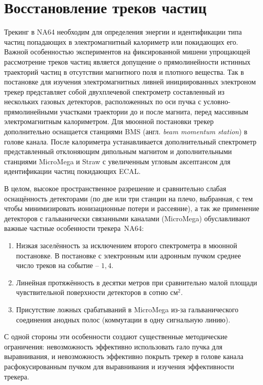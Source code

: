 \section{Восстановление треков частиц}

Трекинг в NA64 необходим для определения энергии и идентификации
типа частиц попадающих в электромагнитный калориметр или
покидающих его. Важной особенностью экспериментов на фиксированной мишени
упрощающей рассмотрение треков частиц является допущение о
прямолинейности истинных траекторий частиц в отсутствии магнитного
поля и плотного вещества. Так в постановке для изучения электромагнитных
ливней инициированных электроном трекер
представляет собой двухплечевой спектрометр составленный
из нескольких газовых детекторов, расположенных по оси пучка с
условно-прямолинейными участками траектории до и после магнита,
перед массивным электромагнитным калориметром.
Для мюонной постановки трекер дополнительно оснащается станциями
BMS (англ. \emph{beam momentum station}) в голове канала.
После калориметра устанавливается дополнительный
спектрометр представленный отклоняющим дипольным магнитом и дополнительными
станциями MicroMega и Straw с увеличенным
угловым аксептансом для идентификации частиц покидающих ECAL.

В целом, высокое пространственное разрешение
и сравнительно слабая оснащённость детекторами (по две или три станции на плечо,
выбранная, с тем чтобы минимизировать ионизационные потери и рассеяние), а
так же применение детекторов с гальванически связанными каналами (MicroMega)
обуславливают важные частные особенности трекера~NA64:
\begin{enumerate}
    \item Низкая заселённость за исключением второго спектрометра в мюонной
    постановке. В постановке с электронным или адронным пучком среднее
    число треков на событие -- $1{,}4$.
    \item Линейная протяжённость в десятки метров при сравнительно малой площади
    чувствительной поверхности детекторов в сотню $\text{см}^2$.
    \item Присутствие ложных срабатываний в MicroMega из-за гальванического
    соединения анодных полос (коммутации в одну сигнальную линию).
\end{enumerate}

С одной стороны эти особенности создают существенные методические
ограничения: невозможность эффективно использовать гало пучка для
выравнивания, и невозможность эффективно покрыть трекер в голове
канала расфокусированным пучком
для выравнивания и изучения эффективности трекера.

